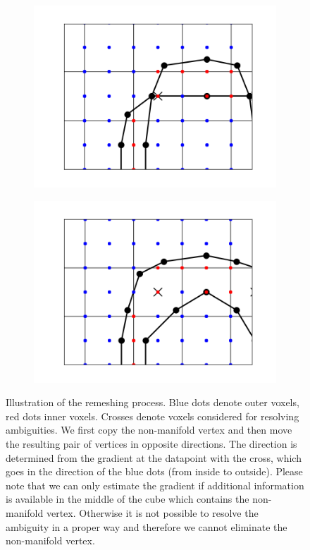 \begin{figure}
\begin{center}
\begin{subfigure}{.5\linewidth}
\centering
\includegraphics[width = \textwidth]{Pictures/SurfaceReconstruction/2DDoubleTorusNonManifoldDetail}
\end{subfigure}%
\begin{subfigure}{.5\linewidth}
\centering
\includegraphics[width = \textwidth]{Pictures/SurfaceReconstruction/2DDoubleTorusManifoldDetail}
\end{subfigure}
\end{center}
\caption{Illustration of the remeshing process. Blue dots denote outer voxels, red dots inner voxels. Crosses denote voxels considered for resolving ambiguities. We first copy the non-manifold vertex and then move the resulting pair of vertices in opposite directions. The direction is determined from the gradient at the datapoint with the cross, which goes in the direction of the blue dots (from inside to outside). Please note that we can only estimate the gradient if additional information is available in the middle of the cube which contains the non-manifold vertex. Otherwise it is not possible to resolve the ambiguity in a proper way and therefore we cannot eliminate the non-manifold vertex.}

\end{figure}
